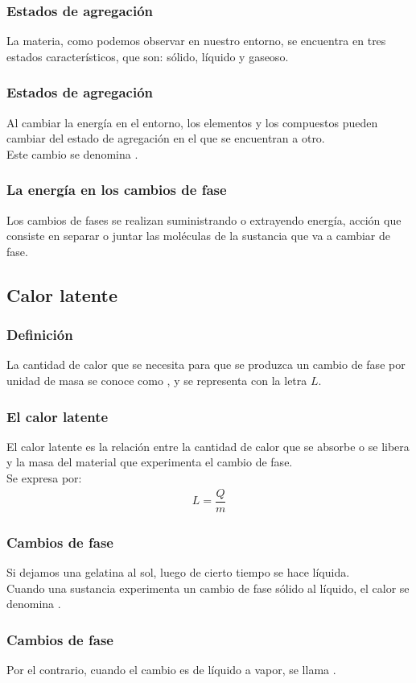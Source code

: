 \documentclass[14pt]{beamer}
\begin{document}
\begin{frame}
\frametitle{Estados de agregación}
La materia, como podemos observar en nuestro entorno, se encuentra en tres estados
característicos, que son: sólido, líquido y gaseoso. 
\end{frame}
\begin{frame}
\frametitle{Estados de agregación}
Al cambiar la energía en el entorno, los elementos y los compuestos pueden cambiar del estado de agregación en el que se encuentran a otro.
\\
\bigskip
\pause
Este cambio se denomina .
\end{frame}
\begin{frame}
\frametitle{La energía en los cambios de fase}
Los cambios de fases se realizan suministrando o extrayendo energía, \pause acción que consiste  en separar o juntar las moléculas de la sustancia que va a cambiar de fase.
\end{frame}

\subsection{Calor latente}

\begin{frame}
\frametitle{Definición}
La cantidad de calor que se necesita para que se produzca un cambio de fase por
unidad de masa se conoce como , y se representa con la letra $L$.
\end{frame}
\begin{frame}
\frametitle{El calor latente}
El calor latente es la relación entre la cantidad de calor que se absorbe o se
libera y la masa del material que experimenta el cambio de fase.
\\
\bigskip
\pause
Se expresa por:
\begin{align*}
L = \dfrac{Q}{m}
\end{align*}
\end{frame}
\begin{frame}
\frametitle{Cambios de fase}
Si dejamos una gelatina al sol, luego de cierto tiempo se hace líquida.
\\
\bigskip
\pause
Cuando una sustancia experimenta un cambio de fase sólido al líquido, el calor se denomina .
\end{frame}
\begin{frame}
\frametitle{Cambios de fase}
Por el contrario, cuando el cambio es de líquido a vapor, se llama .
\end{frame}
\end{document}
